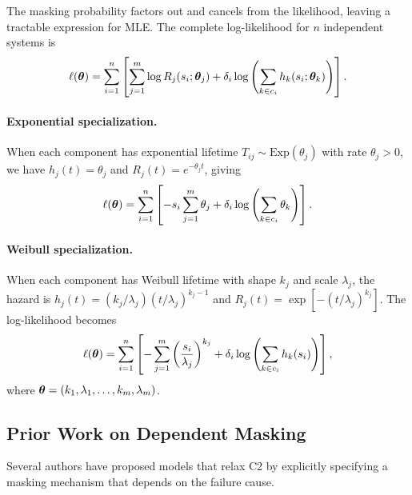 The masking probability factors out and cancels from the likelihood, leaving a
tractable expression for MLE. The complete log-likelihood for $n$ independent
systems is
\begin{equation}
\label{eq:loglike-C123}
    \ell(\bm{\theta}) = \sum_{i=1}^n \left[
        \sum_{j=1}^m \log R_j(s_i; \bm{\theta}_j) +
        \delta_i \log\left(\sum_{k \in c_i} h_k(s_i; \bm{\theta}_k)\right)
    \right].
\end{equation}

\paragraph{Exponential specialization.}
When each component has exponential lifetime $T_{ij} \sim \text{Exp}(\theta_j)$
with rate $\theta_j > 0$, we have $h_j(t) = \theta_j$ and
$R_j(t) = e^{-\theta_j t}$, giving
\begin{equation}
\label{eq:loglike-exp}
    \ell(\bm{\theta}) = \sum_{i=1}^n \left[
        -s_i \sum_{j=1}^m \theta_j +
        \delta_i \log\left(\sum_{k \in c_i} \theta_k\right)
    \right].
\end{equation}

\paragraph{Weibull specialization.}
When each component has Weibull lifetime with shape $k_j$ and scale
$\lambda_j$, the hazard is $h_j(t) = (k_j/\lambda_j)(t/\lambda_j)^{k_j-1}$
and $R_j(t) = \exp[-(t/\lambda_j)^{k_j}]$. The log-likelihood becomes
\begin{equation}
\label{eq:loglike-wei}
    \ell(\bm{\theta}) = \sum_{i=1}^n \left[
        -\sum_{j=1}^m \left(\frac{s_i}{\lambda_j}\right)^{k_j} +
        \delta_i \log\left(\sum_{k \in c_i} h_k(s_i)\right)
    \right],
\end{equation}
where $\bm{\theta} = (k_1, \lambda_1, \ldots, k_m, \lambda_m)$.

\subsection{Prior Work on Dependent Masking}
\label{sec:prior-work}

Several authors have proposed models that relax C2 by explicitly specifying a
masking mechanism that depends on the failure cause.


